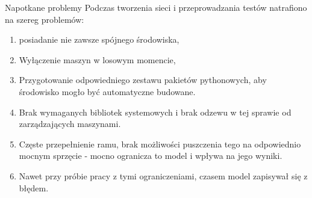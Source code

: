 \begin{frame}{Napotkane problemy}
    Podczas tworzenia sieci i przeprowadzania testów natrafiono na szereg problemów:
    \begin{enumerate}[<+->]
        \item posiadanie nie zawsze spójnego środowiska,
        \item Wyłączenie maszyn w losowym momencie,
        \item Przygotowanie odpowiedniego zestawu pakietów pythonowych, aby środowisko mogło być automatyczne budowane.
        \item Brak wymaganych bibliotek systemowych i brak odzewu w tej sprawie od zarządzających maszynami.
        \item Częste przepełnienie ramu, brak możliwości puszczenia tego na odpowiednio mocnym sprzęcie - mocno ogranicza to model i wpływa na jego wyniki.
        \item Nawet przy próbie pracy z tymi ograniczeniami, czasem model zapisywał się z błędem.
    \end{enumerate}
\end{frame}
